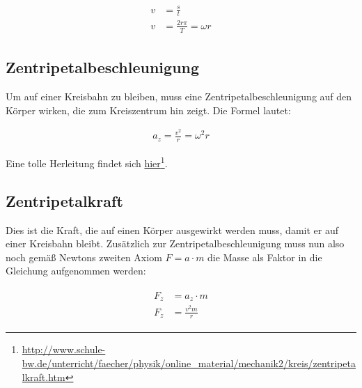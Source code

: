 \begin{align}
\begin{split}
	v &=\frac{s}{t} \\
	v &=\frac{2r\pi}{T} = \omega r
\end{split}
\end{align}


\subsection{Zentripetalbeschleunigung}

Um auf einer Kreisbahn zu bleiben, muss eine Zentripetalbeschleunigung auf den Körper wirken, die zum Kreiszentrum hin zeigt. Die Formel lautet:

\begin{align}
	a_z=\frac{v^2}{r}=\omega^2 r
\end{align}

\noindent Eine tolle Herleitung findet sich \href{http://www.schule-bw.de/unterricht/faecher/physik/online\_material/mechanik2/kreis/zentripetalkraft.htm}{hier}\footnote{\url{http://www.schule-bw.de/unterricht/faecher/physik/online_material/mechanik2/kreis/zentripetalkraft.htm}}.

\subsection{Zentripetalkraft}

Dies ist die Kraft, die auf einen Körper ausgewirkt werden muss, damit er auf einer Kreisbahn bleibt. Zusätzlich zur Zentripetalbeschleunigung muss nun also noch gemäß Newtons zweiten Axiom $F=a \cdot m$ die Masse als Faktor in die Gleichung aufgenommen werden:

\begin{align}
\begin{split}
	F_z &= a_z \cdot m \\
	F_z &= \frac{v^{2}m}{r}
\end{split}
\end{align}
